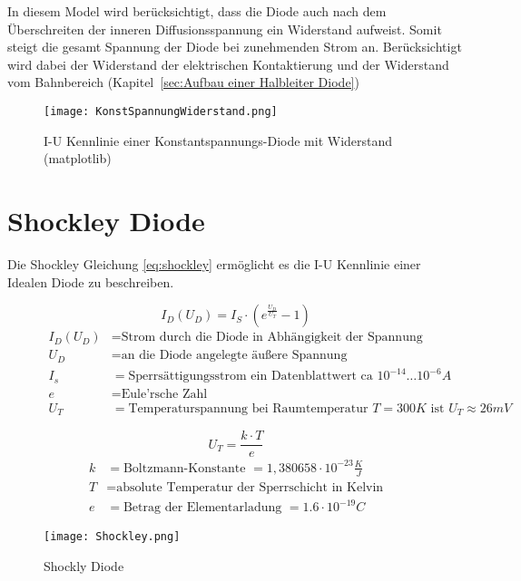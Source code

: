 In diesem Model wird berücksichtigt, dass die Diode auch nach dem Überschreiten der inneren Diffusionsspannung ein Widerstand aufweist. Somit steigt die gesamt Spannung der Diode bei zunehmenden Strom an. Berücksichtigt wird dabei der Widerstand der elektrischen Kontaktierung und der Widerstand vom Bahnbereich (Kapitel\,     \ref{sec:Aufbau einer Halbleiter Diode}) 

\begin{figure}[!htb]
\centering
\texttt{[image: KonstSpannungWiderstand.png]} 
\caption{I-U Kennlinie einer Konstantspannungs-Diode mit Widerstand (matplotlib)}
\end{figure}

\newpage
\section{Shockley Diode}

Die Shockley Gleichung \eqref{eq:shockley} ermöglicht es die I-U Kennlinie einer Idealen Diode zu beschreiben. 

\begin{figure}[!htb]
\begin{equation}
I_{D} (U_{D}) = I_{S} \cdot \left(e^{\frac{U_{D}}{U_{T}}}-1\right)
\label{eq:shockley}
\end{equation}
\begin{align*}
I_{D}(U_{D}) &= \text{Strom durch die Diode in Abhängigkeit der Spannung an der Diode}\\
U_{D} &= \text{an die Diode angelegte äußere Spannung}\\
I_{s} &= \text{Sperrsättigungsstrom ein Datenblattwert ca $10^{-14}\ldots 10^{-6}A$}\\
e &= \text{Eule'rsche Zahl}\\
U_{T} &= \text{Temperaturspannung bei Raumtemperatur $T = 300K $ ist $U_{T} \approx 26mV$ }
\end{align*}
\end{figure}

\begin{figure}[!htb]
\begin{equation}
U_{T} = \dfrac{k \cdot T}{e}
\label{Temperaturspannung}
\end{equation}
\begin{align*}
k &= \text{Boltzmann-Konstante $= 1,380658 \cdot 10^{-23} \scriptstyle \frac{K}{J}$} \\
T &= \text{absolute Temperatur der Sperrschicht in Kelvin}\\
e &= \text{Betrag der Elementarladung $= 1.6 \cdot 10^{-19}C$}
\end{align*}
\end{figure}
\begin{figure}[!hbt]
\centering
\texttt{[image: Shockley.png]}
\caption{Shockly Diode}
\end{figure}
